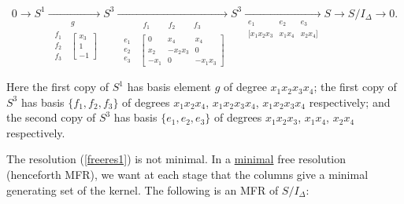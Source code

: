 \documentclass{amsart}
\begin{document}
	\begin{equation} \label{freeres1}
	0 \to S^1 \xrightarrow[
		\begin{array}{cc} & g \\
			\begin{matrix} f_1 \\ f_2 \\ f_3 \end{matrix} &
			\begin{bmatrix} x_3 \\ 1 \\ -1 \end{bmatrix}
		\end{array}
	]{} S^3 \xrightarrow[
		\begin{array}{cc} & \begin{matrix} f_1 &&& f_2 &&& f_3 \end{matrix} \\
			\begin{matrix} e_1 \\ e_2 \\ e_3 \end{matrix} &
			\begin{bmatrix}
				0    & x_4     & x_4 \\
				x_2  & -x_2x_3 & 0 \\
				-x_1 & 0       & -x_1x_3
			\end{bmatrix}
		\end{array}
	]{} S^3 \xrightarrow[
		\begin{array}{ccc}
			    e_1       & e_2    & e_3    \\
			{[} x_1x_2x_3 & x_1x_4 & x_2x_4 {]} \\
		\end{array}
	]{} S \to S/I_\Delta \to 0.
	\end{equation}

Here the first copy of $S^1$ has basis element $g$ of degree $x_1x_2x_3x_4$; the first copy of
$S^3$ has basis $\{f_1,f_2,f_3\}$ of degrees $x_1x_2x_4$, $x_1x_2x_3x_4$, $x_1x_2x_3x_4$
respectively; and the second copy of $S^3$ has basis $\{e_1,e_2,e_3\}$ of degrees $x_1x_2x_3$,
$x_1x_4$, $x_2x_4$ respectively.

The resolution (\ref{freeres1}) is not minimal.  In a \underline{minimal} free resolution
(henceforth MFR), we want at each stage that the columns give a minimal generating set of the
kernel.  The following is an MFR of $S/I_\Delta$:
\end{document}
